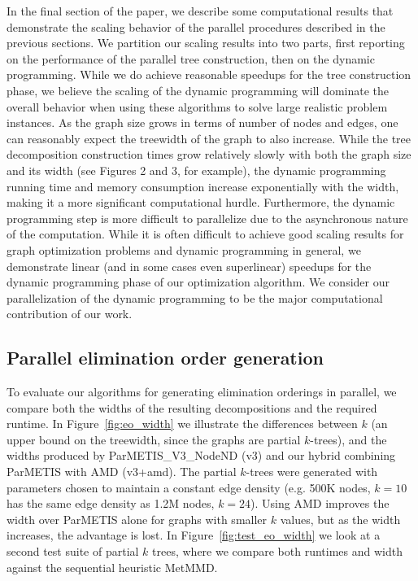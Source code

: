 \documentclass[conference]{IEEEtran}
\begin{document}
In the final section of the paper, we describe some
computational results that demonstrate the scaling behavior
of the parallel procedures described in the previous sections.
We partition our scaling results into two parts, first reporting on the performance of the parallel tree
construction, then on the dynamic programming.  While we do achieve reasonable speedups
for the tree construction phase, we believe the scaling of the dynamic programming will
dominate the overall behavior when using these algorithms to solve large realistic problem instances.
As the graph size grows in terms of number of nodes and edges, one can reasonably
expect the treewidth of the graph to also increase.  While the tree decomposition
construction times grow relatively slowly with both the graph size and its width
(see Figures 2 and 3, for example), the dynamic programming running time and
memory consumption increase exponentially with the width, making it a more
significant computational hurdle.  Furthermore, the dynamic programming step
is more difficult to parallelize due to the asynchronous nature of the computation.
While it is often difficult to achieve good scaling results for graph optimization problems
and dynamic programming in general, we demonstrate linear (and in some cases even superlinear)
speedups for the dynamic programming phase of our optimization algorithm.
We consider our parallelization of the dynamic programming to be the major
computational contribution of our work.

\subsection{Parallel elimination order generation}\label{sec:exp_elimination_order}
To evaluate our algorithms for generating elimination orderings in parallel,
we compare both the widths of the resulting decompositions and the required runtime.
In Figure~\ref{fig:eo_width} we illustrate the differences between $k$ (an upper bound on the treewidth,
since the graphs are partial $k$-trees), and the widths produced by ParMETIS\_V3\_NodeND (v3) and our hybrid combining ParMETIS with AMD (v3+amd). The partial $k$-trees were
generated with parameters chosen to maintain a constant edge density
(e.g. 500K nodes, $k = 10$ has the same edge density as 1.2M nodes, $k = 24$).
Using AMD improves the width over ParMETIS alone for graphs with smaller $k$ values, but
as the width increases, the advantage is lost.
In Figure~\ref{fig:test_eo_width} we look at a second test suite of
partial $k$ trees, where we compare both runtimes and width against the sequential heuristic MetMMD.
\end{document}
